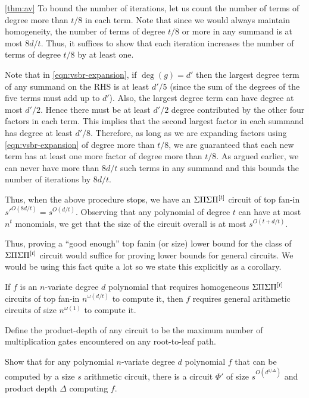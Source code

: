 \begin{proofof}{\autoref{thm:av}}
To bound the number of iterations, let us count the number of terms of degree more than $t/8$ in each term. Note that since we would always maintain homogeneity, the number of terms of degree  $t/8$ or more in any summand  is at most $8d/t$. Thus, it suffices to show that each iteration increases the number of terms of degree $t/8$ by at least one. 

Note that in \eqref{eqn:vsbr-expansion}, if $\deg(g) = d'$ then the largest degree term of any summand on the RHS is at least $d'/5$ (since the sum of the degrees of the five terms must add up to $d'$). Also, the largest degree term can have degree at most $d'/2$. Hence there must be at least $d'/2$ degree contributed by the other four factors in each term. This implies that the second largest factor in each summand has degree at least $d'/8$. Therefore, as long as we are expanding factors using \eqref{eqn:vsbr-expansion} of degree more than $t/8$, we are guaranteed that each new term has at least one more factor of degree more than $t/8$. As argued earlier, we can never have more than $8d/t$ such terms in any summand and this bounds the number of iterations by $8d/t$. 

Thus, when the above procedure stops, we have an $\Sigma\Pi\Sigma\Pi^{[t]}$ circuit of top fan-in $s'^{O(8d/t)} = s^{O(d/t)}$. Observing that any polynomial of degree $t$ can have at most $n^t$ monomials, we get that the size of the circuit overall is at most $s^{O(t + d/t)}$. 
\end{proofof}

Thus, proving a ``good enough'' top fanin (or size) lower bound for the class of $\Sigma\Pi\Sigma\Pi^{[t]}$ circuit would suffice for proving lower bounds for general circuits. We would be using this fact quite a lot so we state this explicitly as a corollary. 

\begin{corollary}\label{cor:av}
If $f$ is an $n$-variate degree $d$ polynomial that requires homogeneous $\Sigma\Pi\Sigma\Pi^{[t]}$ circuits of top fan-in $n^{\omega(d/t)}$ to compute it, then $f$ requires general arithmetic circuits of size $n^{\omega(1)}$ to compute it. 
\end{corollary}

\begin{exercise}
Define the product-depth of any circuit to be the maximum number of multiplication gates encountered on any root-to-leaf path. 

Show that for any polynomial $n$-variate degree $d$ polynomial $f$ that can be computed by a size $s$ arithmetic circuit, there is a circuit $\Phi'$ of size $s^{O(d^{1/\Delta})}$ and product depth $\Delta$ computing $f$. 
\end{exercise}


